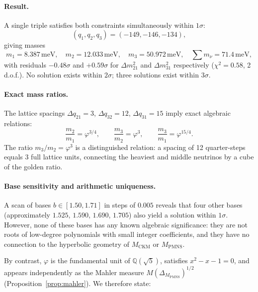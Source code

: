 \documentclass[12pt]{article}
\theoremstyle{definition}
\begin{document}
\paragraph{Result.}
A single triple satisfies both constraints simultaneously within
$1\sigma$:
\begin{equation}
(q_1,q_2,q_3) = (-149,-146,-134),
\end{equation}
giving masses
\begin{equation}
m_1 = 8.387\,\text{meV},\quad
m_2 = 12.033\,\text{meV},\quad
m_3 = 50.972\,\text{meV},\quad
\sum m_\nu = 71.4\,\text{meV},
\end{equation}
with residuals $-0.48\sigma$ and $+0.59\sigma$ for $\Delta m^2_{21}$
and $\Delta m^2_{31}$ respectively ($\chi^2 = 0.58$, 2\,d.o.f.).
No solution exists within $2\sigma$; three solutions exist within
$3\sigma$.

\paragraph{Exact mass ratios.}
The lattice spacings $\Delta q_{21}=3$, $\Delta q_{32}=12$,
$\Delta q_{31}=15$ imply exact algebraic relations:
\begin{equation}
\frac{m_2}{m_1} = \varphi^{3/4},\qquad
\frac{m_3}{m_2} = \varphi^{3},\qquad
\frac{m_3}{m_1} = \varphi^{15/4}.
\end{equation}
The ratio $m_3/m_2 = \varphi^3$ is a distinguished relation: a spacing
of 12 quarter-steps equals 3 full lattice units, connecting the heaviest
and middle neutrinos by a cube of the golden ratio.

\paragraph{Base sensitivity and arithmetic uniqueness.}
A scan of bases $b\in[1.50,1.71]$ in steps of $0.005$ reveals that
four other bases (approximately $1.525$, $1.590$, $1.690$, $1.705$)
also yield a solution within $1\sigma$.  However, none of these bases
has any known algebraic significance: they are not roots of low-degree
polynomials with small integer coefficients, and they have no connection
to the hyperbolic geometry of $M_\text{CKM}$ or $M_\text{PMNS}$.

By contrast, $\varphi$ is the fundamental unit of $\mathbb{Q}(\sqrt{5})$,
satisfies $x^2-x-1=0$, and appears independently as the Mahler measure
$M(\Delta_{M_\text{PMNS}})^{1/2}$ (Proposition~\ref{prop:mahler}).
We therefore state:
\end{document}
